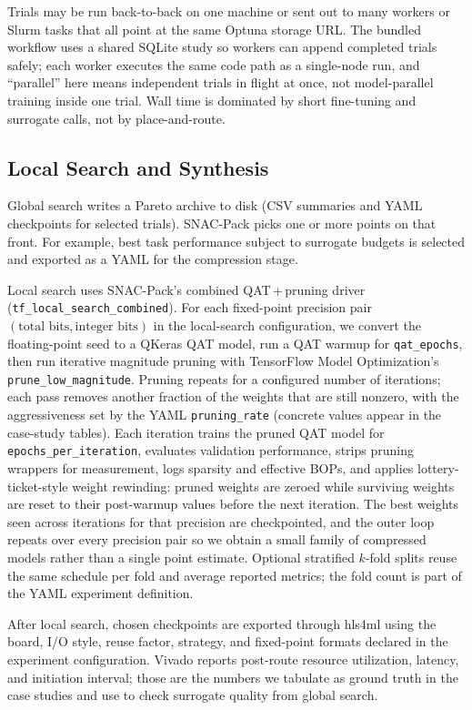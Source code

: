 \documentclass[11pt]{article}
\begin{document}
Trials may be run back-to-back on one machine or sent out to many workers or Slurm tasks that all point at the same Optuna storage URL.
The bundled workflow uses a shared SQLite study so workers can append completed trials safely; each worker executes the same code path as a single-node run, and ``parallel'' here means independent trials in flight at once, not model-parallel training inside one trial.
Wall time is dominated by short fine-tuning and surrogate calls, not by place-and-route.

\subsection{Local Search and Synthesis}
\label{sec:method-local}

Global search writes a Pareto archive to disk (CSV summaries and YAML checkpoints for selected trials).
SNAC-Pack picks one or more points on that front.
For example, best task performance subject to surrogate budgets is selected and exported as a YAML for the compression stage.

Local search uses SNAC-Pack's combined QAT\,+\,pruning driver (\texttt{tf\_local\_search\_combined}).
For each fixed-point precision pair $(\text{total bits}, \text{integer bits})$ in the local-search configuration, we convert the floating-point seed to a QKeras QAT model, run a QAT warmup for \texttt{qat\_epochs}, then run iterative magnitude pruning with TensorFlow Model Optimization's \texttt{prune\_low\_magnitude}.
Pruning repeats for a configured number of iterations; each pass removes another fraction of the weights that are still nonzero, with the aggressiveness set by the YAML \texttt{pruning\_rate} (concrete values appear in the case-study tables).
Each iteration trains the pruned QAT model for \texttt{epochs\_per\_iteration}, evaluates validation performance, strips pruning wrappers for measurement, logs sparsity and effective BOPs, and applies lottery-ticket-style weight rewinding: pruned weights are zeroed while surviving weights are reset to their post-warmup values before the next iteration.
The best weights seen across iterations for that precision are checkpointed, and the outer loop repeats over every precision pair so we obtain a small family of compressed models rather than a single point estimate.
Optional stratified $k$-fold splits reuse the same schedule per fold and average reported metrics; the fold count is part of the YAML experiment definition.

After local search, chosen checkpoints are exported through hls4ml using the board, I/O style, reuse factor, strategy, and fixed-point formats declared in the experiment configuration.
Vivado reports post-route resource utilization, latency, and initiation interval; those are the numbers we tabulate as ground truth in the case studies and use to check surrogate quality from global search.
\end{document}
